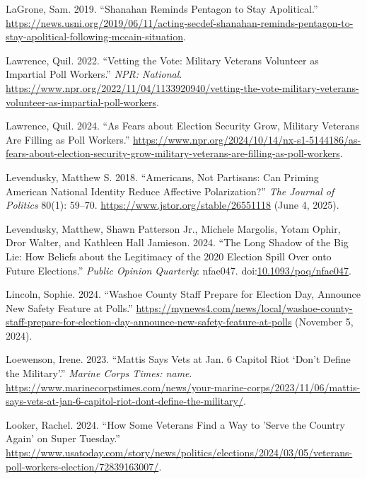 \documentclass[
  12pt,
  letterpaper,
]{article}
\newlength{\cslhangindent}
\newenvironment{CSLReferences}[2] %
 {\begin{list}{}{%
  \setlength{\itemindent}{0pt}
  \setlength{\leftmargin}{0pt}
  \setlength{\parsep}{0pt}
  \ifodd #1
   \setlength{\leftmargin}{\cslhangindent}
   \setlength{\itemindent}{-1\cslhangindent}
  \fi
  \setlength{\itemsep}{#2\baselineskip}}}
 {\end{list}}
\begin{document}
\begin{CSLReferences}{1}{1}
LaGrone, Sam. 2019. {``Shanahan {Reminds Pentagon} to {Stay
Apolitical}.''}
\url{https://news.usni.org/2019/06/11/acting-secdef-shanahan-reminds-pentagon-to-stay-apolitical-following-mccain-situation}.

Lawrence, Quil. 2022. {``Vetting the {Vote}: {Military} Veterans
Volunteer as Impartial Poll Workers.''} \emph{NPR: National}.
\url{https://www.npr.org/2022/11/04/1133920940/vetting-the-vote-military-veterans-volunteer-as-impartial-poll-workers}.

Lawrence, Quil. 2024. {``As Fears about Election Security Grow, Military
Veterans Are Filling as Poll Workers.''}
\url{https://www.npr.org/2024/10/14/nx-s1-5144186/as-fears-about-election-security-grow-military-veterans-are-filling-as-poll-workers}.

Levendusky, Matthew S. 2018. {``Americans, {Not Partisans}: {Can Priming
American National Identity Reduce Affective Polarization}?''} \emph{The
Journal of Politics} 80(1): 59--70.
\url{https://www.jstor.org/stable/26551118} (June 4, 2025).

Levendusky, Matthew, Shawn Patterson Jr., Michele Margolis, Yotam Ophir,
Dror Walter, and Kathleen Hall Jamieson. 2024. {``The {Long Shadow} of
the {Big Lie}: {How Beliefs} about the {Legitimacy} of the 2020
{Election Spill Over} onto {Future Elections}.''} \emph{Public Opinion
Quarterly}: nfae047.
doi:\href{https://doi.org/10.1093/poq/nfae047}{10.1093/poq/nfae047}.

Lincoln, Sophie. 2024. {``Washoe {County} Staff Prepare for {Election
Day}, Announce New Safety Feature at Polls.''}
\url{https://mynews4.com/news/local/washoe-county-staff-prepare-for-election-day-announce-new-safety-feature-at-polls}
(November 5, 2024).

Loewenson, Irene. 2023. {``Mattis Says Vets at {Jan}. 6 {Capitol} Riot
{`Don't Define the Military'}.''} \emph{Marine Corps Times: name}.
\url{https://www.marinecorpstimes.com/news/your-marine-corps/2023/11/06/mattis-says-vets-at-jan-6-capitol-riot-dont-define-the-military/}.

Looker, Rachel. 2024. {``How Some Veterans Find a Way to 'Serve the
Country Again' on {Super Tuesday}.''}
\url{https://www.usatoday.com/story/news/politics/elections/2024/03/05/veterans-poll-workers-election/72839163007/}.


\end{CSLReferences}
\end{document}
